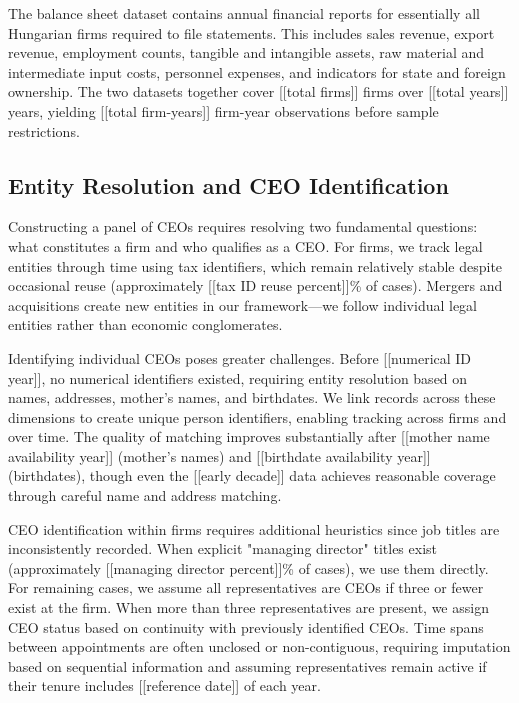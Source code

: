 \documentclass[11pt,a4paper]{article}
\begin{document}
The balance sheet dataset contains annual financial reports for essentially all Hungarian firms required to file statements. This includes sales revenue, export revenue, employment counts, tangible and intangible assets, raw material and intermediate input costs, personnel expenses, and indicators for state and foreign ownership. The two datasets together cover [[total firms]] firms over [[total years]] years, yielding [[total firm-years]] firm-year observations before sample restrictions.

\subsection{Entity Resolution and CEO Identification}

Constructing a panel of CEOs requires resolving two fundamental questions: what constitutes a firm and who qualifies as a CEO. For firms, we track legal entities through time using tax identifiers, which remain relatively stable despite occasional reuse (approximately [[tax ID reuse percent]]\% of cases). Mergers and acquisitions create new entities in our framework—we follow individual legal entities rather than economic conglomerates.

Identifying individual CEOs poses greater challenges. Before [[numerical ID year]], no numerical identifiers existed, requiring entity resolution based on names, addresses, mother's names, and birthdates. We link records across these dimensions to create unique person identifiers, enabling tracking across firms and over time. The quality of matching improves substantially after [[mother name availability year]] (mother's names) and [[birthdate availability year]] (birthdates), though even the [[early decade]] data achieves reasonable coverage through careful name and address matching.

CEO identification within firms requires additional heuristics since job titles are inconsistently recorded. When explicit "managing director" titles exist (approximately [[managing director percent]]\% of cases), we use them directly. For remaining cases, we assume all representatives are CEOs if three or fewer exist at the firm. When more than three representatives are present, we assign CEO status based on continuity with previously identified CEOs. Time spans between appointments are often unclosed or non-contiguous, requiring imputation based on sequential information and assuming representatives remain active if their tenure includes [[reference date]] of each year.
\end{document}
